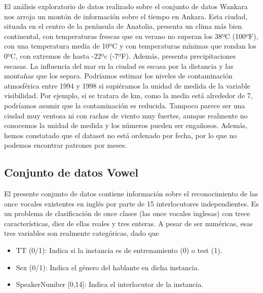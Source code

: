 El análisis exploratorio de datos realizado sobre el conjunto de datos Wankara nos arroja un montón de información sobre el tiempo en Ankara. Esta ciudad, situada en el centro de la península de Anatolia, presenta un clima más bien continental, con temperaturas frescas que en verano no superan los 38ºC (100ºF), con una temperatura media de 10ºC y con temperaturas mínimas que rondan los 0ºC, con extremos de hasta -22ºc (-7ºF). Además, presenta precipitaciones escasas. La influencia del mar en la ciudad es escasa por la distancia y las montañas que los separa. Podríamos estimar los niveles de contaminación atmosférica entre 1994 y 1998 si supiéramos la unidad de medida de la variable visibilidad. Por ejemplo, si se tratara de km, como la media está alrededor de 7, podríamos asumir que la contaminación es reducida. Tampoco parece ser una ciudad muy ventosa ni con rachas de viento muy fuertes, aunque realmente no conocemos la unidad de medida y los números pueden ser engañosos. Además, hemos constatado que el dataset no está ordenado por fecha, por lo que no podemos encontrar patrones por meses.      


\newpage
\subsection{Conjunto de datos Vowel}

El presente conjunto de datos contiene información sobre el reconocimiento de las once vocales existentes en inglés por parte de 15 interlocutores independientes. Es un problema de clasificación de once clases (las once vocales inglesas) con trece características, diez de ellas reales y tres enteras. A pesar de ser numéricas, esas tres variables son realmente categóricas, dado que

\begin{itemize}
	\item TT (0/1): Indica si la instancia es de entrenamiento (0) o test (1).
	\item Sex (0/1): Indica el género del hablante en dicha instancia.
	\item SpeakerNumber [0,14]: Indica el interlocutor de la instancia.
\end{itemize}

